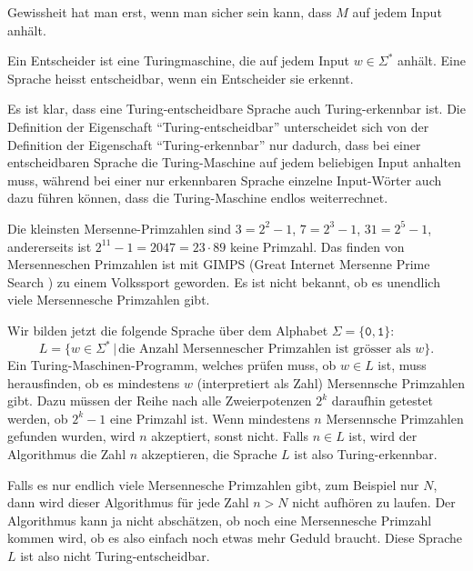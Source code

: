 Gewissheit hat man erst, wenn man sicher sein kann, dass $M$ auf
jedem Input anhält.

\begin{definition}
%
Ein Entscheider ist eine Turingmaschine, die auf jedem Input $w\in\Sigma^*$
anhält. Eine Sprache heisst entscheidbar, wenn ein Entscheider sie
erkennt.
%
\end{definition}
Es ist klar, dass eine Turing-entscheidbare Sprache auch Turing-erkennbar
ist.
Die Definition der Eigenschaft ``Turing-entscheidbar'' unterscheidet sich
von der Definition der Eigenschaft ``Turing-erkennbar'' nur dadurch,
dass bei einer entscheidbaren Sprache die Turing-Maschine auf jedem
beliebigen Input anhalten muss, während bei einer nur erkennbaren
Sprache einzelne Input-Wörter auch dazu führen können, dass die
Turing-Maschine endlos weiterrechnet.

\begin{beispiel}
Die kleinsten Mersenne-Primzahlen sind $3=2^2-1$, $7=2^3-1$, $31=2^5-1$,
andererseits ist $2^{11}-1=2047=23\cdot 89$ keine Primzahl.
Das finden von Mersenneschen Primzahlen ist mit GIMPS (Great Internet
Mersenne Prime Search \cite{skript:gimps}) zu einem Volkssport geworden.
Es ist nicht bekannt, ob es unendlich viele Mersennesche Primzahlen gibt.

Wir bilden jetzt die folgende Sprache über dem Alphabet
$\Sigma=\{\texttt{0},\texttt{1}\}$:
\[
L=\{w\in\Sigma^*\,|\,\text{die Anzahl Mersennescher Primzahlen ist grösser als $w$}\}.
\]
Ein Turing-Maschinen-Programm, welches prüfen muss, ob $w\in L$ ist,
muss herausfinden, ob es mindestens $w$ (interpretiert als Zahl)
Mersennsche Primzahlen gibt.
Dazu müssen der Reihe nach alle Zweierpotenzen $2^k$ daraufhin getestet werden,
ob $2^k-1$ eine Primzahl ist.
Wenn mindestens $n$ Mersennsche Primzahlen gefunden wurden, wird $n$
akzeptiert, sonst nicht. Falls $n\in L$ ist, wird der Algorithmus
die Zahl $n$ akzeptieren, die Sprache $L$ ist also Turing-erkennbar.

Falls es nur endlich viele Mersennesche Primzahlen gibt, zum Beispiel
nur $N$, dann wird dieser Algorithmus für jede Zahl $n>N$ nicht
aufhören zu laufen.
Der Algorithmus kann ja nicht abschätzen, ob noch eine Mersennesche
Primzahl kommen wird, ob es also einfach noch etwas mehr Geduld
braucht.
Diese Sprache $L$ ist also nicht Turing-entscheidbar.
\end{beispiel}

